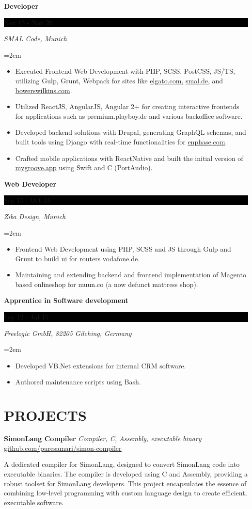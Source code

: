 \documentclass[fontsize=11pt]{article}
\newcommand{\link}[1]{{\color{blue}\underline{\href{#1}{#1}}}}
\newcommand{\sepspace}{\vspace*{1em}}   %
\newcommand{\NewPart}[1]{\section*{\uppercase{#1}}}
\newcommand{\EducationEntry}[4]{
    \noindent \textbf{#1} \hfill      %
    \colorbox{Black}{
      \parbox{8.5em}{
      \hfill\color{White}#2}} \par  %
    \noindent \textit{#3} \par        %
    \noindent\hangindent=2em\hangafter=0 \small #4 %
    \normalsize \par}
\newcommand{\WorkEntry}[4]{       %
    \noindent \textbf{#1} \hfill      %
    \colorbox{Black}{%
      \parbox{9em}{%
      \hfill\color{White}#2}} \par   %
        \noindent \textit{#3} \par        %
    \noindent\hangindent=2em\hangafter=0 \small #4 %
    \normalsize \par}
\newcommand{\ProjectEntry}[4]{         %
    \noindent \textbf{#1} \noindent \textit{#3} \hfill {#2} \par
    \noindent \small #4 %
    \normalsize \par}
\begin{document}
\sepspace
\WorkEntry
{Developer}
{Nov 15 - Nov 20}
{SMAL Code, Munich}
{\begin{itemize} \itemsep -1pt
	\item Executed Frontend Web Development with PHP, SCSS, PostCSS, JS/TS, utilizing Gulp, Grunt, Webpack for sites like \link{elgato.com}, \link{smal.de}, and \link{bowerswilkins.com}.
	\item Utilized ReactJS, AngularJS, Angular 2+ for creating interactive frontends for applications such as premium.playboy.de and various backoffice software.
	\item Developed backend solutions with Drupal, generating GraphQL schemas, and built tools using Django with real-time functionalities for \link{enphase.com}.
	\item Crafted mobile applications with ReactNative and built the initial version of \link{mygroove.app} using Swift and C (PortAudio).
	\end{itemize}}
\sepspace
\bigskip
\WorkEntry
{Web Developer}
{Sep 15 - Oct 15}
{Ziba Design, Munich}
{\begin{itemize} \itemsep -1pt
	\item Frontend Web Development using PHP, SCSS and JS through Gulp and Grunt to build ui for routers \link{vodafone.de}.
	\item Maintaining and extending backend and frontend implementation of Magento based onlineshop for muun.co (a now defunct mattress shop).
	\end{itemize}}
\sepspace
\WorkEntry
{Apprentice in Software development}
{Sep 12 - Jul 15}
{Freelogic GmbH, 82205 Gilching, Germany}
{\begin{itemize} \itemsep -1pt
	\item Developed VB.Net extensions for internal CRM software.
	\item Authored maintenance scripts using Bash.
	\end{itemize}}

\NewPart{Projects}{}

\ProjectEntry{SimonLang Compiler}{\link{github.com/puresamari/simon-compiler}}
{Compiler, C, Assembly, executable binary}
{A dedicated compiler for SimonLang, designed to convert SimonLang code into executable binaries. The compiler is developed using C and Assembly, providing a robust toolset for SimonLang developers. This project encapsulates the essence of combining low-level programming with custom language design to create efficient, executable software.}
\end{document}
